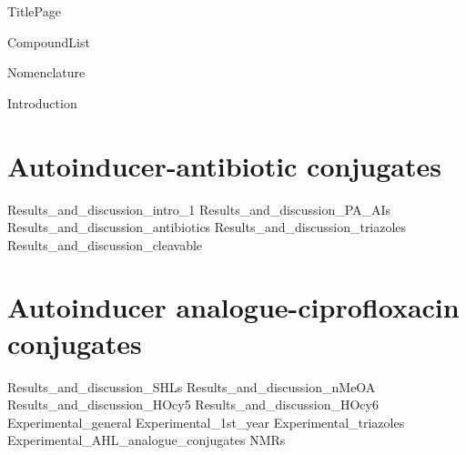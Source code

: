 \documentclass[10pt,a4paper]{article}
\begin{document}
{TitlePage}

{CompoundList}

\tableofcontents

%
\newpage
{Nomenclature}
\printnomenclature

\newpage
{Introduction}
\newpage
\section{Autoinducer-antibiotic conjugates}
{Results_and_discussion_intro_1}
{Results_and_discussion_PA_AIs}
{Results_and_discussion_antibiotics}
{Results_and_discussion_triazoles}
{Results_and_discussion_cleavable}
\section{Autoinducer analogue-ciprofloxacin conjugates}
{Results_and_discussion_SHLs}
{Results_and_discussion_nMeOA}
{Results_and_discussion_HOcy5}
{Results_and_discussion_HOcy6}
\newpage
{Experimental_general}
{Experimental_1st_year}
{Experimental_triazoles}
{Experimental_AHL_analogue_conjugates}
{NMRs}

\newpage
{}


\listoftodos
\end{document}
